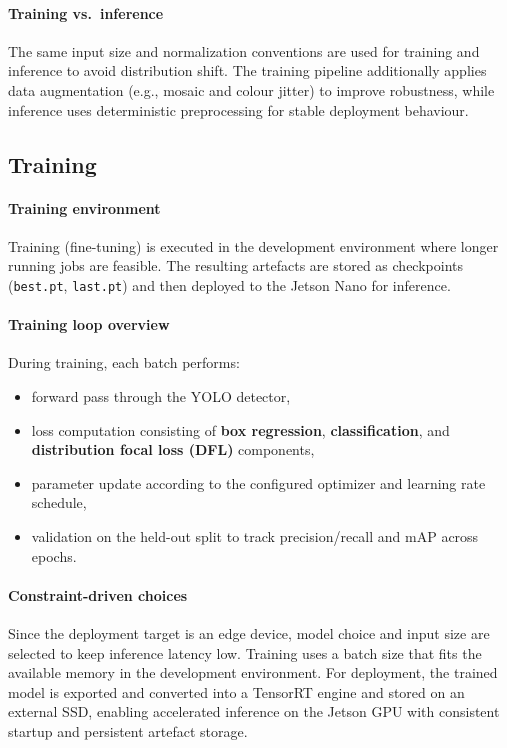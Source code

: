 \paragraph{Training vs.\ inference}
The same input size and normalization conventions are used for training and inference to avoid distribution shift. The training pipeline additionally applies data augmentation (e.g., mosaic and colour jitter) to improve robustness, while inference uses deterministic preprocessing for stable deployment behaviour.

\subsection{Training}
\label{subsec:kdd_training}

\paragraph{Training environment}
Training (fine-tuning) is executed in the development environment where longer running jobs are feasible. The resulting artefacts are stored as checkpoints (\texttt{best.pt}, \texttt{last.pt}) and then deployed to the Jetson Nano for inference.

\paragraph{Training loop overview}
During training, each batch performs:
\begin{itemize}
	\item forward pass through the YOLO detector,
	\item loss computation consisting of \textbf{box regression}, \textbf{classification}, and \textbf{distribution focal loss (DFL)} components,
	\item parameter update according to the configured optimizer and learning rate schedule,
	\item validation on the held-out split to track precision/recall and mAP across epochs.
\end{itemize}

\paragraph{Constraint-driven choices}
Since the deployment target is an edge device, model choice and input size are selected to keep inference latency low. Training uses a batch size that fits the available memory in the development environment. For deployment, the trained model is exported and converted into a TensorRT engine and stored on an external SSD, enabling accelerated inference on the Jetson GPU with consistent startup and persistent artefact storage.

